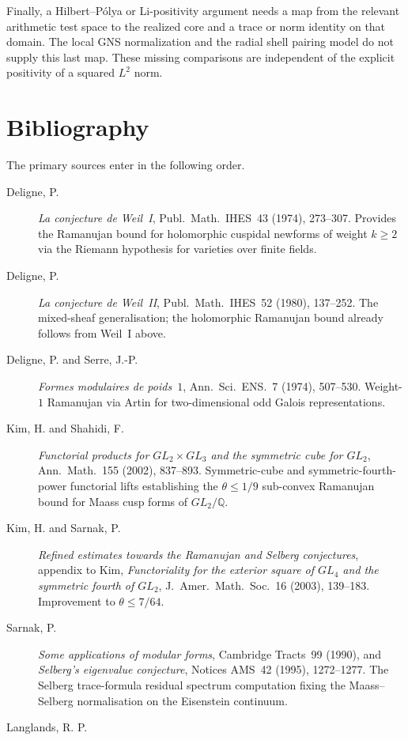 Finally, a Hilbert--P\'olya or Li-positivity argument needs a
map from the relevant arithmetic test space to the realized
core and a trace or norm identity on that domain. The local
GNS normalization and the radial shell pairing model do not
supply this last map. These missing comparisons are independent
of the explicit positivity of a squared $L^2$ norm.

\section{Bibliography}
\label{v4-arith:w5-c:bibliography}

The primary sources enter in the following order.

\begin{description}
\item[Deligne, P.]
\emph{La conjecture de Weil~I}, Publ.~Math.~IHES~43 (1974), 273--307.
Provides the Ramanujan bound for holomorphic cuspidal newforms of
weight \(k\geq 2\) via the Riemann hypothesis for varieties over finite
fields.
\item[Deligne, P.]
\emph{La conjecture de Weil~II}, Publ.~Math.~IHES~52 (1980), 137--252.
The mixed-sheaf generalisation; the holomorphic Ramanujan bound already
follows from Weil~I above.
\item[Deligne, P. and Serre, J.-P.]
\emph{Formes modulaires de poids~\(1\)}, Ann.~Sci.~ENS.~7 (1974), 507--530.
Weight-\(1\) Ramanujan via Artin for two-dimensional odd Galois
representations.
\item[Kim, H. and Shahidi, F.]
\emph{Functorial products for \(GL_{2}\times GL_{3}\) and the symmetric
cube for \(GL_{2}\)}, Ann.~Math.~155 (2002), 837--893. Symmetric-cube
and symmetric-fourth-power functorial lifts establishing the
\(\theta\leq 1/9\) sub-convex Ramanujan bound for Maass cusp forms of
\(GL_{2}/\mathbb{Q}\).
\item[Kim, H. and Sarnak, P.]
\emph{Refined estimates towards the Ramanujan and Selberg conjectures},
appendix to Kim, \emph{Functoriality for the exterior square of
\(GL_{4}\) and the symmetric fourth of \(GL_{2}\)}, J.~Amer.~Math.~Soc.~16
(2003), 139--183. Improvement to \(\theta\leq 7/64\).
\item[Sarnak, P.]
\emph{Some applications of modular forms}, Cambridge Tracts~99 (1990),
and \emph{Selberg's eigenvalue conjecture}, Notices AMS~42 (1995),
1272--1277. The Selberg trace-formula residual spectrum computation
fixing the Maass--Selberg normalisation on the Eisenstein continuum.
\item[Langlands, R. P.]

\end{description}
